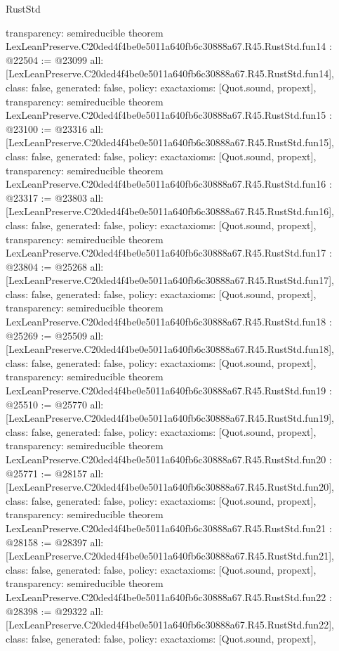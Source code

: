 \begin{lexlean}{RustStd}
\begin{coremodule}
{  transparency: semireducible
}
theorem LexLeanPreserve.C20ded4f4be0e5011a640fb6c30888a67.R45.RustStd.fun14 : @22504 := @23099 {
  all: [LexLeanPreserve.C20ded4f4be0e5011a640fb6c30888a67.R45.RustStd.fun14],
  class: false,
  generated: false,
  policy: exact{axioms: [Quot.sound, propext]},
  transparency: semireducible
}
theorem LexLeanPreserve.C20ded4f4be0e5011a640fb6c30888a67.R45.RustStd.fun15 : @23100 := @23316 {
  all: [LexLeanPreserve.C20ded4f4be0e5011a640fb6c30888a67.R45.RustStd.fun15],
  class: false,
  generated: false,
  policy: exact{axioms: [Quot.sound, propext]},
  transparency: semireducible
}
theorem LexLeanPreserve.C20ded4f4be0e5011a640fb6c30888a67.R45.RustStd.fun16 : @23317 := @23803 {
  all: [LexLeanPreserve.C20ded4f4be0e5011a640fb6c30888a67.R45.RustStd.fun16],
  class: false,
  generated: false,
  policy: exact{axioms: [Quot.sound, propext]},
  transparency: semireducible
}
theorem LexLeanPreserve.C20ded4f4be0e5011a640fb6c30888a67.R45.RustStd.fun17 : @23804 := @25268 {
  all: [LexLeanPreserve.C20ded4f4be0e5011a640fb6c30888a67.R45.RustStd.fun17],
  class: false,
  generated: false,
  policy: exact{axioms: [Quot.sound, propext]},
  transparency: semireducible
}
theorem LexLeanPreserve.C20ded4f4be0e5011a640fb6c30888a67.R45.RustStd.fun18 : @25269 := @25509 {
  all: [LexLeanPreserve.C20ded4f4be0e5011a640fb6c30888a67.R45.RustStd.fun18],
  class: false,
  generated: false,
  policy: exact{axioms: [Quot.sound, propext]},
  transparency: semireducible
}
theorem LexLeanPreserve.C20ded4f4be0e5011a640fb6c30888a67.R45.RustStd.fun19 : @25510 := @25770 {
  all: [LexLeanPreserve.C20ded4f4be0e5011a640fb6c30888a67.R45.RustStd.fun19],
  class: false,
  generated: false,
  policy: exact{axioms: [Quot.sound, propext]},
  transparency: semireducible
}
theorem LexLeanPreserve.C20ded4f4be0e5011a640fb6c30888a67.R45.RustStd.fun20 : @25771 := @28157 {
  all: [LexLeanPreserve.C20ded4f4be0e5011a640fb6c30888a67.R45.RustStd.fun20],
  class: false,
  generated: false,
  policy: exact{axioms: [Quot.sound, propext]},
  transparency: semireducible
}
theorem LexLeanPreserve.C20ded4f4be0e5011a640fb6c30888a67.R45.RustStd.fun21 : @28158 := @28397 {
  all: [LexLeanPreserve.C20ded4f4be0e5011a640fb6c30888a67.R45.RustStd.fun21],
  class: false,
  generated: false,
  policy: exact{axioms: [Quot.sound, propext]},
  transparency: semireducible
}
theorem LexLeanPreserve.C20ded4f4be0e5011a640fb6c30888a67.R45.RustStd.fun22 : @28398 := @29322 {
  all: [LexLeanPreserve.C20ded4f4be0e5011a640fb6c30888a67.R45.RustStd.fun22],
  class: false,
  generated: false,
  policy: exact{axioms: [Quot.sound, propext]},
}
\end{coremodule}
\end{lexlean}
